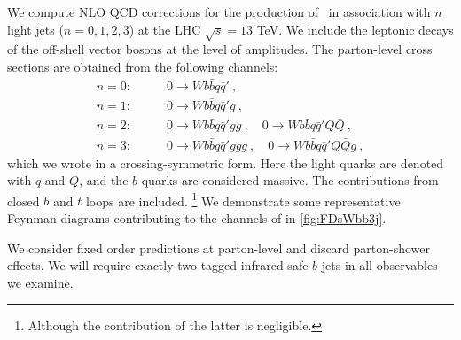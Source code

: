 We compute NLO QCD corrections for the production of \Wbb~in association with $n$ light jets ($n =
0,1,2,3$) at the LHC $\sqrt{s} = 13$ TeV. 
We include the leptonic decays of the off-shell vector bosons at the level of amplitudes.
The parton-level cross sections are obtained from the following channels:
\begin{subequations}
  \begin{align}
    n=0:&\qquad 0\rightarrow Wb{\bar b}q{\bar q}'\ ,\\
    n=1:&\qquad 0\rightarrow Wb{\bar b}q{\bar q}'g\ ,\\
    n=2:&\qquad 0\rightarrow Wb{\bar b}q{\bar q}'gg\ ,\quad  0\rightarrow Wb{\bar b}q{\bar q}'Q{\bar Q}\ ,\\
    n=3:&\qquad 0\rightarrow Wb{\bar b}q{\bar q}'ggg\ ,\quad  0\rightarrow Wb{\bar b}q{\bar q}'Q{\bar Q}g\ ,
  \end{align}
\end{subequations}
which we wrote in a crossing-symmetric form. 
Here the light quarks are denoted with $q$ and $Q$, and the $b$ quarks are considered massive.
The contributions from closed $b$ and $t$ loops are included. \footnote{
  Although the contribution of the latter is negligible.
}
We demonstrate some representative Feynman diagrams contributing to the channels of \Wbbjjj{} in \cref{fig:FDsWbb3j}.

We consider fixed order predictions at parton-level and discard parton-shower
effects. We will require exactly two tagged infrared-safe $b$ jets \cite{Banfi:2006hf}
in all observables we examine.

